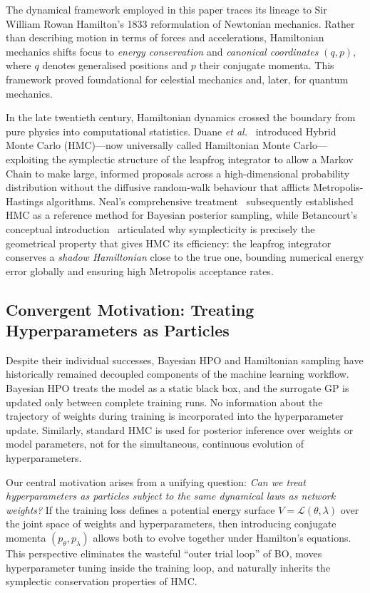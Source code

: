\documentclass[12pt,a4paper]{article}
\begin{document}
The dynamical framework employed in this paper traces its lineage to
Sir William Rowan Hamilton's 1833 reformulation of Newtonian mechanics.
Rather than describing motion in terms of forces and accelerations,
Hamiltonian mechanics shifts focus to \emph{energy conservation} and
\emph{canonical coordinates} $(q, p)$, where $q$ denotes generalised
positions and $p$ their conjugate momenta.  This framework proved
foundational for celestial mechanics and, later, for quantum mechanics.

In the late twentieth century, Hamiltonian dynamics crossed the
boundary from pure physics into computational statistics.  Duane
\emph{et al.}~\cite{duane1987} introduced Hybrid Monte Carlo (HMC)—now
universally called Hamiltonian Monte Carlo—exploiting the symplectic
structure of the leapfrog integrator to allow a Markov Chain to make
large, informed proposals across a high-dimensional probability
distribution without the diffusive random-walk behaviour that afflicts
Metropolis-Hastings algorithms.  Neal's comprehensive
treatment~\cite{neal2011} subsequently established HMC as a reference
method for Bayesian posterior sampling, while Betancourt's conceptual
introduction~\cite{betancourt2017} articulated why symplecticity is
precisely the geometrical property that gives HMC its efficiency: the
leapfrog integrator conserves a \emph{shadow Hamiltonian} close to the
true one, bounding numerical energy error globally and ensuring high
Metropolis acceptance rates.

\subsection{Convergent Motivation: Treating Hyperparameters as Particles}

Despite their individual successes, Bayesian HPO and Hamiltonian
sampling have historically remained decoupled components of the machine
learning workflow.  Bayesian HPO treats the model as a static black
box, and the surrogate GP is updated only between complete training
runs.  No information about the trajectory of weights during training
is incorporated into the hyperparameter update.  Similarly, standard
HMC is used for posterior inference over weights or model parameters,
not for the simultaneous, continuous evolution of hyperparameters.

Our central motivation arises from a unifying question: \emph{Can we
treat hyperparameters as particles subject to the same dynamical laws as
network weights?}  If the training loss defines a potential energy
surface $V = \mathcal{L}(\theta, \lambda)$ over the joint space of
weights and hyperparameters, then introducing conjugate momenta
$(p_\theta, p_\lambda)$ allows both to evolve together under Hamilton's
equations.  This perspective eliminates the wasteful ``outer trial
loop'' of BO, moves hyperparameter tuning inside the training loop, and
naturally inherits the symplectic conservation properties of HMC.
\end{document}
